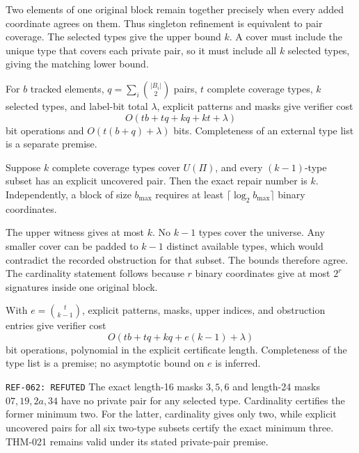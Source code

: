 \documentclass[11pt]{article}
\begin{document}
\begin{claimproof}
Two elements of one original block remain together precisely when every
added coordinate agrees on them.  Thus singleton refinement is equivalent
to pair coverage.  The selected types give the upper bound \(k\).  A cover
must include the unique type that covers each private pair, so it must
include all \(k\) selected types, giving the matching lower bound.

For \(b\) tracked elements, \(q=\sum_i\binom{|B_i|}{2}\) pairs, \(t\)
complete coverage types, \(k\) selected types, and label-bit total
\(\lambda\), explicit patterns and masks give verifier cost
\[
 O(tb+tq+kq+kt+\lambda)
\]
bit operations and \(O(t(b+q)+\lambda)\) bits.  Completeness of an external
type list is a separate premise.
\end{claimproof}

{}
Suppose \(k\) complete coverage types cover \(U(\Pi)\), and every
\((k-1)\)-type subset has an explicit uncovered pair.  Then the exact repair
number is \(k\).  Independently, a block of size \(b_{\max}\) requires at
least \(\lceil\log_2b_{\max}\rceil\) binary coordinates.

\begin{claimproof}
The upper witness gives at most \(k\).  No \(k-1\) types cover the universe.
Any smaller cover can be padded to \(k-1\) distinct available types, which
would contradict the recorded obstruction for that subset.  The bounds
therefore agree.  The cardinality statement follows because \(r\) binary
coordinates give at most \(2^r\) signatures inside one original block.

With \(e=\binom{t}{k-1}\), explicit patterns, masks, upper indices, and
obstruction entries give verifier cost
\[
 O(tb+tq+kq+e(k-1)+\lambda)
\]
bit operations, polynomial in the explicit certificate length.  Completeness
of the type list is a premise; no asymptotic bound on \(e\) is inferred.
\end{claimproof}

{\texttt{REF-062: REFUTED}}
The exact length-16 masks \(3,5,6\) and length-24 masks
\(07,19,2a,34\) have no private pair for any selected type.  Cardinality
certifies the former minimum two.  For the latter, cardinality gives only two,
while explicit uncovered pairs for all six two-type subsets certify the exact
minimum three.  THM-021 remains valid under its stated private-pair premise.
\end{document}
